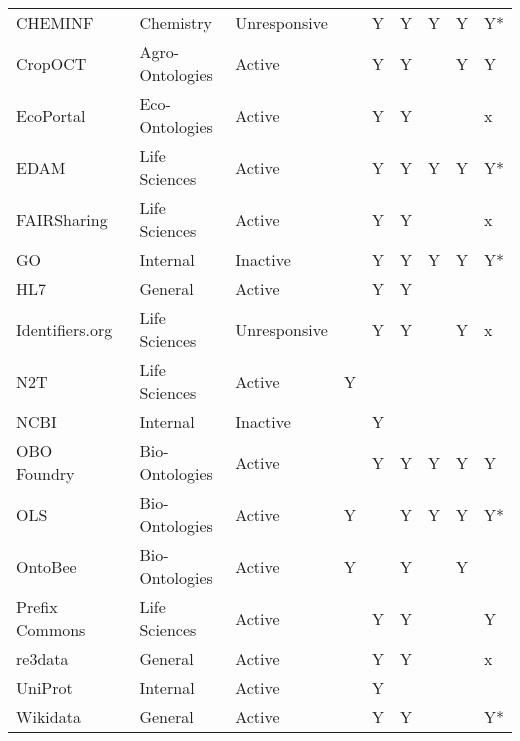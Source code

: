 \begin{table}
\begin{tabular}{lllllllll}
CHEMINF~\cite{Hastings2011} & Chemistry & Unresponsive &  & Y & Y & Y & Y & Y* \\
CropOCT~\cite{Arnaud2020} & Agro-Ontologies & Active &  & Y & Y &  & Y & Y \\
EcoPortal~\cite{Kechagioglou2021} & Eco-Ontologies & Active &  & Y & Y &  &  & x \\
EDAM~\cite{Ison2013} & Life Sciences & Active &  & Y & Y & Y & Y & Y* \\
FAIRSharing~\cite{Sansone2019} & Life Sciences & Active &  & Y & Y &  &  & x \\
GO~\cite{TheGeneOntologyConsortium2019} & Internal & Inactive &  & Y & Y & Y & Y & Y* \\
HL7~\cite{Bender2013} & General & Active &  & Y & Y &  &  &  \\
Identifiers.org~\cite{Juty2012} & Life Sciences & Unresponsive &  & Y & Y &  & Y & x \\
N2T~\cite{Wimalaratne2018} & Life Sciences & Active & Y &  &  &  &  &  \\
NCBI~\cite{Clark2016} & Internal & Inactive &  & Y &  &  &  &  \\
OBO Foundry~\cite{Jackson2021} & Bio-Ontologies & Active &  & Y & Y & Y & Y & Y \\
OLS~\cite{Cote2006a} & Bio-Ontologies & Active & Y &  & Y & Y & Y & Y* \\
OntoBee~\cite{Ong2017} & Bio-Ontologies & Active & Y &  & Y &  & Y &  \\
Prefix Commons~\cite{prefixcommons} & Life Sciences & Active &  & Y & Y &  &  & Y \\
re3data~\cite{Pampel2013} & General & Active &  & Y & Y &  &  & x \\
UniProt~\cite{Bateman2021} & Internal & Active &  & Y &  &  &  &  \\
Wikidata~\cite{Waagmeester2020} & General & Active &  & Y & Y &  &  & Y* \\
\bottomrule
\end{tabular}
\end{table}
